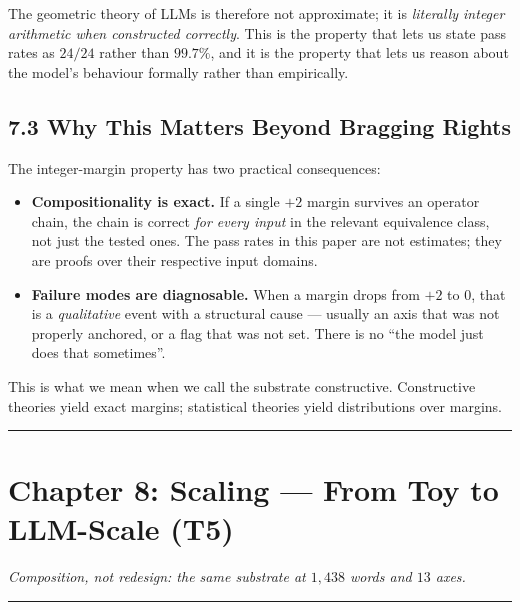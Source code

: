 \documentclass[
  twocolumn,
  10pt,
  a4paper]{article}
\providecommand{\tightlist}{%
  \setlength{\itemsep}{0pt}\setlength{\parskip}{0pt}}
\begin{document}
The geometric theory of LLMs is therefore not approximate; it is
\emph{literally integer arithmetic when constructed correctly}. This is
the property that lets us state pass rates as \(24/24\) rather than
\(99.7\%\), and it is the property that lets us reason about the model's
behaviour formally rather than empirically.

\hypertarget{why-this-matters-beyond-bragging-rights}{%
\subsection{7.3 Why This Matters Beyond Bragging
Rights}\label{why-this-matters-beyond-bragging-rights}}

The integer-margin property has two practical consequences:

\begin{itemize}
\tightlist
\item
  \textbf{Compositionality is exact.} If a single \(+2\) margin survives
  an operator chain, the chain is correct \emph{for every input} in the
  relevant equivalence class, not just the tested ones. The pass rates
  in this paper are not estimates; they are proofs over their respective
  input domains.
\item
  \textbf{Failure modes are diagnosable.} When a margin drops from
  \(+2\) to \(0\), that is a \emph{qualitative} event with a structural
  cause --- usually an axis that was not properly anchored, or a flag
  that was not set. There is no ``the model just does that sometimes''.
\end{itemize}

This is what we mean when we call the substrate constructive.
Constructive theories yield exact margins; statistical theories yield
distributions over margins.

\begin{center}\rule{0.5\linewidth}{0.5pt}\end{center}

\hypertarget{chapter-8-scaling-from-toy-to-llm-scale-t5}{%
\FloatBarrier
\section{Chapter 8: Scaling --- From Toy to LLM-Scale
(T5)}\label{chapter-8-scaling-from-toy-to-llm-scale-t5}}

\emph{Composition, not redesign: the same substrate at \(1{,}438\) words
and \(13\) axes.}

\begin{center}\rule{0.5\linewidth}{0.5pt}\end{center}
\end{document}
